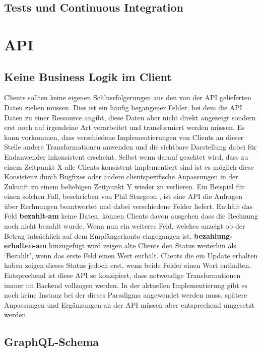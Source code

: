 \subsection{Tests und Continuous Integration}

\section{API}

\subsection{Keine Business Logik im Client}
Clients sollten keine eigenen Schlussfolgerungen aus den von der API gelieferten Daten ziehen müssen. Dies ist ein häufig begangener Fehler, bei dem die API Daten zu einer Ressource angibt, diese Daten aber nicht direkt angezeigt sondern erst noch auf irgendeine Art verarbeitet und transformiert werden müssen. Es kann vorkommen, dass verschiedene Implementierungen von Clients an dieser Stelle andere Transformationen anwenden und die sichtbare Darstellung dabei für Endanwender inkonsistent erscheint. Selbst wenn darauf geachtet wird, dass zu einem Zeitpunkt X alle Clients konsistent implementiert sind ist es möglich diese Konsistenz durch Bugfixes oder andere clientspezifische Anpassungen in der Zukunft zu einem beliebigen Zeitpunkt Y wieder zu verlieren. Ein Beispiel für einen solchen Fall, beschrieben von Phil Sturgeon \parencite{sturgeon_2017}, ist eine API die Anfragen über Rechnungen beantwortet und dabei verschiedene Felder liefert. Enthält das Feld \textbf{bezahlt-am} keine Daten, können Clients davon ausgehen dass die Rechnung noch nicht bezahlt wurde. Wenn nun ein weiteres Feld, welches anzeigt ob der Betrag tatsächlich auf dem Empfängerkonto eingegangen ist, \textbf{bezahlung-erhalten-am} hinzugefügt wird zeigen alte Clients den Status weiterhin als `Bezahlt', wenn das erste Feld einen Wert enthält. Clients die ein Update erhalten haben zeigen dieses Status jedoch erst, wenn beide Felder einen Wert enthalten.
Entsprechend ist diese API so konzipiert, dass notwendige Transformationen immer im Backend vollzogen werden. In der aktuellen Implementierung gibt es noch keine Instanz bei der dieses Paradigma angewendet werden muss, spätere Anpassungen und Ergänzungen an der API müssen aber entsprechend umgesetzt werden.

\subsection{GraphQL-Schema} %
 